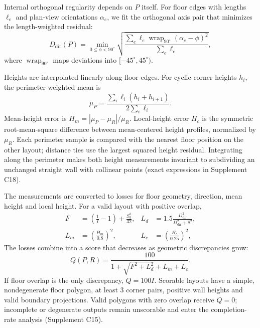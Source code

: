 Internal orthogonal regularity depends on $P$ itself. For floor edges with lengths $\ell_e$ and plan-view orientations $\alpha_e$, we fit the orthogonal axis pair that minimizes the length-weighted residual:
\begin{equation}
 D_{\mathrm{dir}}(P)=\min_{0\leq\phi<90^\circ}
 \sqrt{\frac{\sum_e\ell_e\operatorname{wrap}_{90^\circ}(\alpha_e-\phi)^2}{\sum_e\ell_e}},
 \label{eq:direction}
\end{equation}
where $\operatorname{wrap}_{90^\circ}$ maps deviations into $[-45^\circ,45^\circ)$.

Heights are interpolated linearly along floor edges. For cyclic corner heights $h_i$, the perimeter-weighted mean is
\begin{equation}
 \mu_P=\frac{\sum_i\ell_i(h_i+h_{i+1})}{2\sum_i\ell_i}.
 \label{eq:perimeter-height}
\end{equation}
Mean-height error is $H_m=|\mu_P-\mu_R|/\mu_R$. Local-height error $H_c$ is the symmetric root-mean-square difference between mean-centered height profiles, normalized by $\mu_R$. Each perimeter sample is compared with the nearest floor position on the other layout; distance ties use the largest squared height residual. Integrating along the perimeter makes both height measurements invariant to subdividing an unchanged straight wall with collinear points (exact expressions in Supplement C18).

The measurements are converted to losses for floor geometry, direction, mean height and local height. For a valid layout with positive overlap,
\begin{align}
 F&=\left(\frac1I-1\right)+\frac{S_b^2}{32}, &
 L_d&=1.5\frac{D_{\mathrm{dir}}^2}{D_{\mathrm{dir}}^2+8^2},\label{eq:floor-loss}\\
 L_m&=\left(\frac{H_m}{0.8}\right)^2, &
 L_c&=\left(\frac{H_c}{0.25}\right)^2,\label{eq:height-loss}
\end{align}
The losses combine into a score that decreases as geometric discrepancies grow:
\begin{equation}
 Q(P,R)=\frac{100}{1+\sqrt{F^2+L_d^2}+L_m+L_c}.\label{eq:quality}
\end{equation}
If floor overlap is the only discrepancy, $Q=100I$. Scorable layouts have a simple, nondegenerate floor polygon, at least 3 corner pairs, positive wall heights and valid boundary projections. Valid polygons with zero overlap receive $Q=0$; incomplete or degenerate outputs remain unscorable and enter the completion-rate analysis (Supplement C15).

